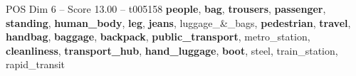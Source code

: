 \begin{textsample}{POS Dim 6 – Score 13.00 – t005158}  \label{ex:f6_pos_022}
\textbf{people}, \textbf{bag}, \textbf{trousers}, \textbf{passenger}, \textbf{standing}, \textbf{human\_body}, \textbf{leg}, \textbf{jeans}, luggage\_\&\_bags, \textbf{pedestrian}, \textbf{travel}, \textbf{handbag}, \textbf{baggage}, \textbf{backpack}, \textbf{public\_transport}, metro\_station, \textbf{cleanliness}, \textbf{transport\_hub}, \textbf{hand\_luggage}, \textbf{boot}, steel, train\_station, rapid\_transit

\end{textsample}
